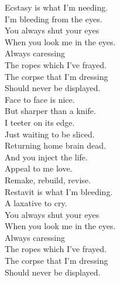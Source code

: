 Ecstasy is what I'm needing. \\
I'm bleeding from the eyes. \\
You always shut your eyes \\
When you look me in the eyes. \\

Always caressing \\
The ropes which I've frayed. \\
The corpse that I'm dressing \\
Should never be displayed. \\

Face to face is nice. \\
But sharper than a knife. \\
I teeter on its edge. \\
Just waiting to be sliced. \\
Returning home brain dead. \\
And you inject the life. \\
Appeal to me love. \\
Remake, rebuild, revise. \\

Restavit is what I'm bleeding. \\
A laxative to cry. \\
You always shut your eyes \\
When you look me in the eyes. \\

Always caressing \\
The ropes which I've frayed. \\
The corpse that I'm dressing \\
Should never be displayed. \\




